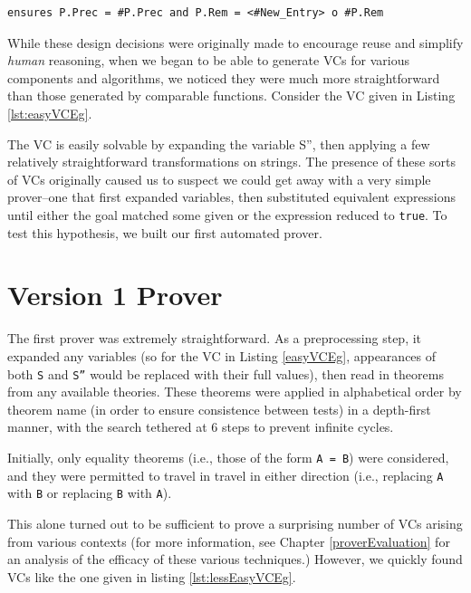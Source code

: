 \begin{lstlisting}[language=RESOLVE]
	ensures P.Prec = #P.Prec and P.Rem = <#New_Entry> o #P.Rem
\end{lstlisting}

While these design decisions were originally made to encourage reuse and simplify \emph{human} reasoning, when we began to be able to generate VCs for various components and algorithms, we noticed they were much more straightforward than those generated by comparable functions.  Consider the VC given in Listing \ref{lst:easyVCEg}.



The VC is easily solvable by expanding the variable S'', then applying a few relatively straightforward transformations on strings.  The presence of these sorts of VCs originally caused us to suspect we could get away with a very simple prover--one that first expanded variables, then substituted equivalent expressions until either the goal matched some given or the expression reduced to \texttt{true}.  To test this hypothesis, we built our first automated prover.


\section{Version 1 Prover}

The first prover was extremely straightforward.  As a preprocessing step, it expanded any variables (so for the VC in Listing \ref{easyVCEg}, appearances of both \texttt{S} and \texttt{S''} would be replaced with their full values), then read in theorems from any available theories.  These theorems were applied in alphabetical order by theorem name (in order to ensure consistence between tests) in a depth-first manner, with the search tethered at 6 steps to prevent infinite cycles.

Initially, only equality theorems (i.e., those of the form \texttt{A = B}) were considered, and they were permitted to travel in travel in either direction (i.e., replacing \texttt{A} with \texttt{B} or replacing \texttt{B} with \texttt{A}).

This alone turned out to be sufficient to prove a surprising number of VCs arising from various contexts (for more information, see Chapter \ref{proverEvaluation} for an analysis of the efficacy of these various techniques.)  However, we quickly found VCs like the one given in listing \ref{lst:lessEasyVCEg}.

